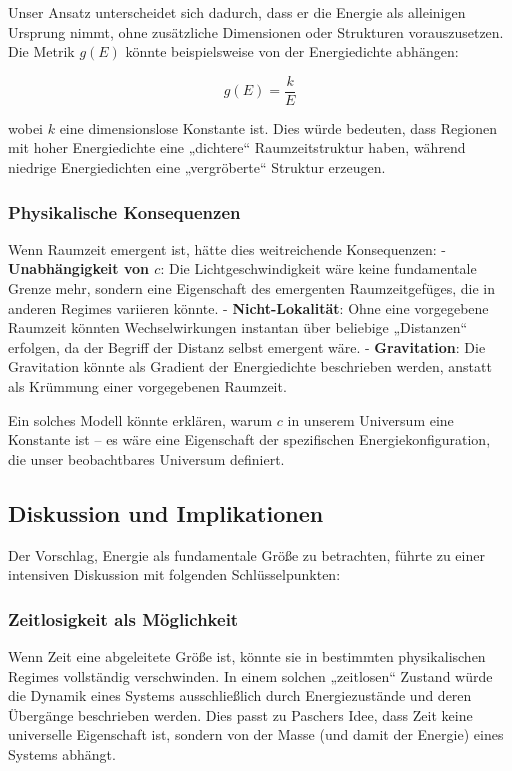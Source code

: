 \documentclass{article}
\begin{document}
	Unser Ansatz unterscheidet sich dadurch, dass er die Energie als alleinigen Ursprung nimmt, ohne zusätzliche Dimensionen oder Strukturen vorauszusetzen. Die Metrik \( g(E) \) könnte beispielsweise von der Energiedichte abhängen:
	
	\[
	g(E) = \frac{k}{E}
	\]
	
	wobei \( k \) eine dimensionslose Konstante ist. Dies würde bedeuten, dass Regionen mit hoher Energiedichte eine „dichtere“ Raumzeitstruktur haben, während niedrige Energiedichten eine „vergröberte“ Struktur erzeugen.
	
	\subsubsection{Physikalische Konsequenzen}
	
	Wenn Raumzeit emergent ist, hätte dies weitreichende Konsequenzen:
	- \textbf{Unabhängigkeit von \( c \)}: Die Lichtgeschwindigkeit wäre keine fundamentale Grenze mehr, sondern eine Eigenschaft des emergenten Raumzeitgefüges, die in anderen Regimes variieren könnte.
	- \textbf{Nicht-Lokalität}: Ohne eine vorgegebene Raumzeit könnten Wechselwirkungen instantan über beliebige „Distanzen“ erfolgen, da der Begriff der Distanz selbst emergent wäre.
	- \textbf{Gravitation}: Die Gravitation könnte als Gradient der Energiedichte beschrieben werden, anstatt als Krümmung einer vorgegebenen Raumzeit.
	
	Ein solches Modell könnte erklären, warum \( c \) in unserem Universum eine Konstante ist – es wäre eine Eigenschaft der spezifischen Energiekonfiguration, die unser beobachtbares Universum definiert.
	
	\subsection{Diskussion und Implikationen}
	
	Der Vorschlag, Energie als fundamentale Größe zu betrachten, führte zu einer intensiven Diskussion mit folgenden Schlüsselpunkten:
	
	\subsubsection{Zeitlosigkeit als Möglichkeit}
	
	Wenn Zeit eine abgeleitete Größe ist, könnte sie in bestimmten physikalischen Regimes vollständig verschwinden. In einem solchen „zeitlosen“ Zustand würde die Dynamik eines Systems ausschließlich durch Energiezustände und deren Übergänge beschrieben werden. Dies passt zu Paschers Idee, dass Zeit keine universelle Eigenschaft ist, sondern von der Masse (und damit der Energie) eines Systems abhängt.
	
\end{document}
